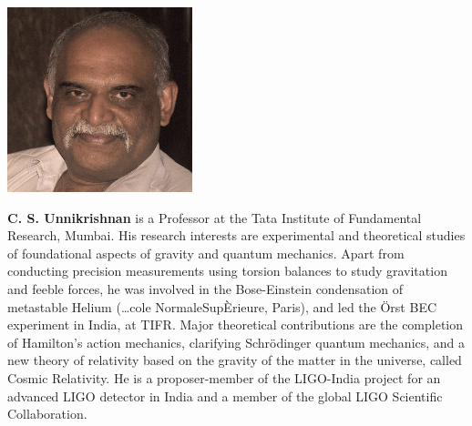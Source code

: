 \centerline{\includegraphics[scale=.7]{authorsphotos//C_S_Unnikrishnan.png}} 
\bigskip

\noindent
\textbf{C. S. Unnikrishnan} is a Professor at the Tata Institute of Fundamental Research, Mumbai. His research interests are experimental and theoretical studies of foundational aspects of gravity and quantum mechanics. Apart from conducting precision measurements using torsion balances to study gravitation and feeble forces, he was involved in the Bose-Einstein condensation of metastable Helium (…cole Normale\break Sup\`Erieure, Paris), and led the \"{O}rst BEC experiment in India, at TIFR. Major theoretical contributions are the completion of Hamilton's action mechanics, clarifying Schr\"{o}dinger quantum mechanics, and a new theory of relativity based on the gravity of the matter in the universe, called Cosmic Relativity. He is a proposer-member of the LIGO-India project for an advanced LIGO detector in India and a member of the global LIGO Scientific Collaboration.

